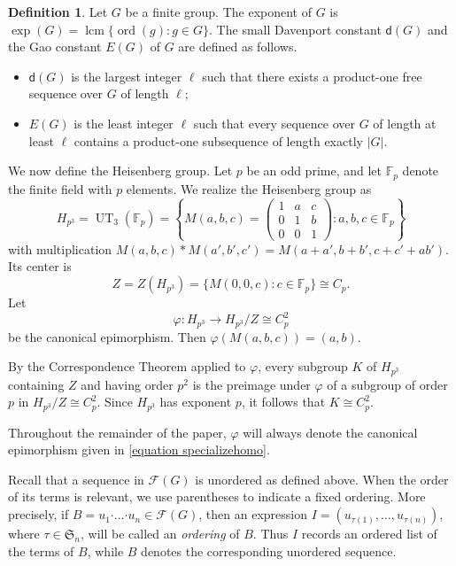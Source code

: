 \documentclass[a4paper, 12pt]{article}
\theoremstyle{definition}
\newtheorem{definition}[theorem]{Definition}
\DeclareMathOperator{\ord}{ord}
\begin{document}
\begin{samepage}
\begin{definition}
Let $G$ be a finite group. The exponent of $G$ is
$\exp(G)=\operatorname{lcm}\{\ord(g):g\in G\}.$ The small Davenport constant $\mathsf d(G)$ and the Gao constant $E(G)$ of $G$ are defined as follows.
\begin{itemize}
\item[$\bullet$] $\mathsf d(G)$ is the largest integer $\ell$ such that
there exists a product-one free sequence over $G$ of length $\ell$;

\item[$\bullet$] $E(G)$ is the least integer $\ell$ such that every
sequence over $G$ of length at least $\ell$ contains a product-one
subsequence of length exactly $|G|$.

\end{itemize}
\end{definition}
\end{samepage}

We now define the Heisenberg group. Let $p$ be an odd prime, and let $\mathbb F_p$ denote the finite field with $p$ elements.
We realize the Heisenberg group as
$$H_{p^3}=\operatorname{UT}_3(\mathbb F_p)
=
\left\{
M(a,b,c)=
\begin{pmatrix}
1&a&c\\
0&1&b\\
0&0&1
\end{pmatrix}
:a,b,c\in\mathbb F_p
\right\}$$
with multiplication
$M(a,b,c)\ast M(a',b',c') = M(a+a',b+b',c+c'+ab')$.
Its center is
\begin{equation}\label{equation:centerisCp}
Z=Z(H_{p^3})= \{M(0,0,c):c\in\mathbb F_p\}\cong C_p.
\end{equation}
Let
\begin{equation}\label{equation specializehomo}
\varphi:H_{p^3}\longrightarrow H_{p^3}/Z\cong C_p^2
\end{equation}
be the canonical epimorphism. Then
$\varphi(M(a,b,c))=(a,b)$.


By the Correspondence Theorem applied to $\varphi$, every subgroup
$K$ of $H_{p^3}$ containing $Z$ and having order $p^2$ is the
preimage under $\varphi$ of a subgroup of order $p$ in
$H_{p^3}/Z\cong C_p^2$. Since $H_{p^3}$ has exponent $p$, it follows
that $K\cong C_p^2$.

Throughout the remainder of the paper,
$\varphi$ will always denote the canonical epimorphism given in
\eqref{equation specializehomo}.


Recall that a sequence in $\mathcal F(G)$ is unordered as defined above.  When the order
of its terms is relevant, we use parentheses to indicate a fixed
ordering. More precisely, if
$B=u_1\boldsymbol{\cdot}\ldots\boldsymbol{\cdot}u_n\in\mathcal F(G)$,
then an expression
$I=(u_{\tau(1)},\ldots,u_{\tau(n)})$, where
$\tau\in\mathfrak S_n$, will be called an \emph{ordering} of $B$.
Thus $I$ records an ordered list of the terms of $B$, while $B$
denotes the corresponding unordered sequence.
\end{document}
